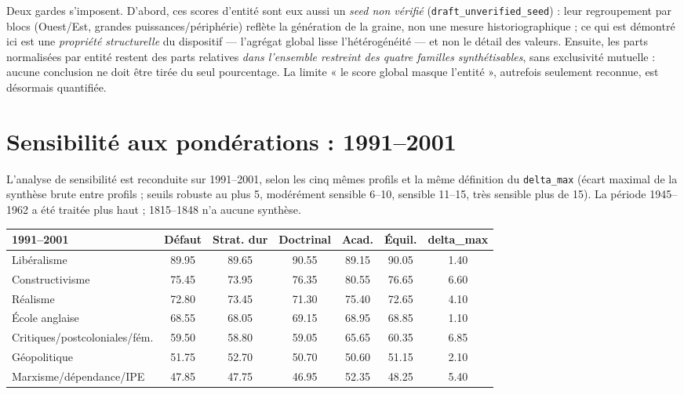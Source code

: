 \documentclass[11pt,a4paper]{article}
\begin{document}
Deux gardes s'imposent. D'abord, ces scores d'entité sont eux aussi un \emph{seed non vérifié} (\texttt{draft\_unverified\_seed}) : leur regroupement par blocs (Ouest/Est, grandes puissances/périphérie) reflète la génération de la graine, non une mesure historiographique ; ce qui est démontré ici est une \emph{propriété structurelle} du dispositif --- l'agrégat global lisse l'hétérogénéité --- et non le détail des valeurs. Ensuite, les parts normalisées par entité restent des parts relatives \emph{dans l'ensemble restreint des quatre familles synthétisables}, sans exclusivité mutuelle : aucune conclusion ne doit être tirée du seul pourcentage. La limite « le score global masque l'entité », autrefois seulement reconnue, est désormais quantifiée.

\section{Sensibilité aux pondérations : 1991--2001}

L'analyse de sensibilité est reconduite sur 1991--2001, selon les cinq mêmes profils et la même définition du \texttt{delta\_max} (écart maximal de la synthèse brute entre profils ; seuils robuste au plus 5, modérément sensible 6--10, sensible 11--15, très sensible plus de 15). La période 1945--1962 a été traitée plus haut ; 1815--1848 n'a aucune synthèse.

\begin{center}
\begin{tabular}{p{3.4cm}cccccc}
\hline
1991--2001 & Défaut & Strat. dur & Doctrinal & Acad. & Équil. & delta\_max \\
\hline
Libéralisme & 89.95 & 89.65 & 90.55 & 89.15 & 90.05 & 1.40 \\
Constructivisme & 75.45 & 73.95 & 76.35 & 80.55 & 76.65 & 6.60 \\
Réalisme & 72.80 & 73.45 & 71.30 & 75.40 & 72.65 & 4.10 \\
École anglaise & 68.55 & 68.05 & 69.15 & 68.95 & 68.85 & 1.10 \\
Critiques/postcoloniales/fém. & 59.50 & 58.80 & 59.05 & 65.65 & 60.35 & 6.85 \\
Géopolitique & 51.75 & 52.70 & 50.70 & 50.60 & 51.15 & 2.10 \\
Marxisme/dépendance/IPE & 47.85 & 47.75 & 46.95 & 52.35 & 48.25 & 5.40 \\
\hline
\end{tabular}
\end{center}
\end{document}
